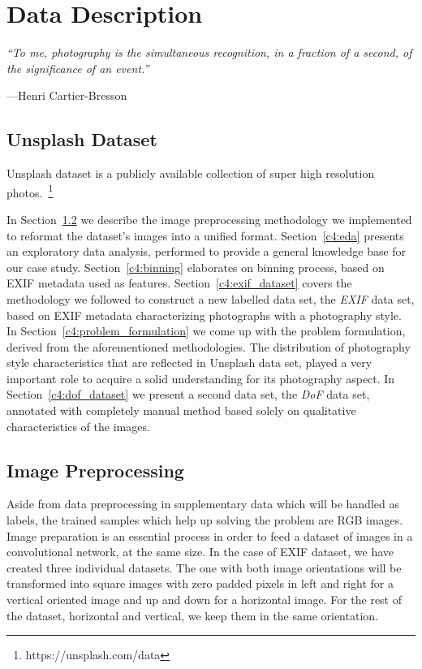 \chapter{Data Description} \label{c4:intro}
\epigraph{\itshape ``To me, photography is the simultaneous recognition, in a fraction of a second, of the significance of an event.''}
{---Henri Cartier-Bresson}

\section{Unsplash Dataset}


Unsplash dataset is a publicly available collection of super high resolution photos.~\footnote{https://unsplash.com/data} 

In Section~\ref{c4:image_preprocessing} we describe the image preprocessing methodology we implemented to reformat the dataset's images into a unified format.
Section~\ref{c4:eda} presents an exploratory data analysis, performed to provide a general knowledge base for our case study.
Section~\ref{c4:binning} elaborates on binning process, based on EXIF metadata used as features.
Section~\ref{c4:exif_dataset} covers the methodology we followed to construct a new labelled data set, the \textit{EXIF} data set, based on EXIF metadata characterizing photographs with a photography style.
In Section~\ref{c4:problem_formulation} we come up with the problem formulation, derived from the aforementioned methodologies. The distribution of photography style characteristics that are reflected in Unsplash data set, played a very important role to acquire a solid understanding for its photography aspect.
In Section~\ref{c4:dof_dataset} we present a second data set, the \textit{DoF} data set, annotated with completely manual method based solely on qualitative characteristics of the images.


\section{Image Preprocessing}
\label{c4:image_preprocessing}

Aside from data preprocessing in supplementary data which will be handled as labels, the trained samples which help up solving the problem are RGB images. Image preparation is an essential process in order to feed a dataset of images in a convolutional network, at the same size.
In the case of EXIF dataset, we have created three individual datasets.
The one with both image orientations will be transformed into square images with zero padded pixels in left and right for a vertical oriented image and up and down for a horizontal image.
For the rest of the dataset, horizontal and vertical, we keep them in the same orientation.

